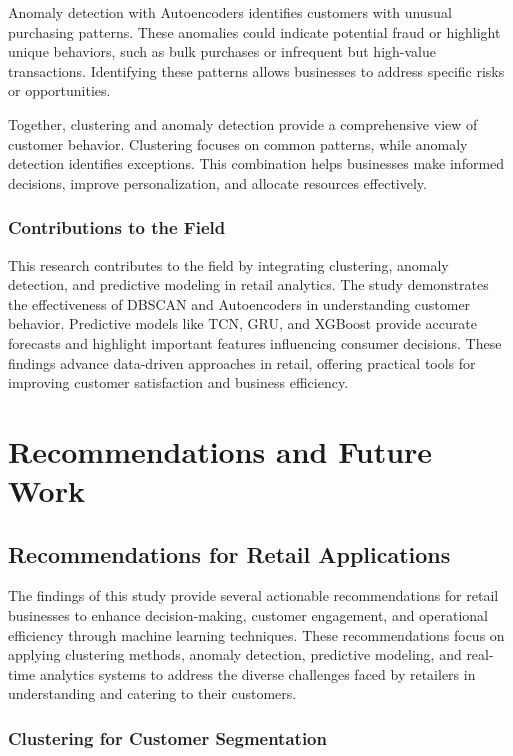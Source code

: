 \documentclass[12pt, a4paper,twoside]{report}
\theoremstyle{plain} %
\theoremstyle{definition} %
\theoremstyle{remark} %
\numberwithin{equation}{chapter}
\begin{document}
Anomaly detection with Autoencoders identifies customers with unusual purchasing patterns. These anomalies could indicate potential fraud or highlight unique behaviors, such as bulk purchases or infrequent but high-value transactions. Identifying these patterns allows businesses to address specific risks or opportunities.

Together, clustering and anomaly detection provide a comprehensive view of customer behavior. Clustering focuses on common patterns, while anomaly detection identifies exceptions. This combination helps businesses make informed decisions, improve personalization, and allocate resources effectively.

\subsection{Contributions to the Field}

This research contributes to the field by integrating clustering, anomaly detection, and predictive modeling in retail analytics. The study demonstrates the effectiveness of DBSCAN and Autoencoders in understanding customer behavior. Predictive models like TCN, GRU, and XGBoost provide accurate forecasts and highlight important features influencing consumer decisions. These findings advance data-driven approaches in retail, offering practical tools for improving customer satisfaction and business efficiency.




\chapter{Recommendations and Future Work}
\section{Recommendations for Retail Applications}

The findings of this study provide several actionable recommendations for retail businesses to enhance decision-making, customer engagement, and operational efficiency through machine learning techniques. These recommendations focus on applying clustering methods, anomaly detection, predictive modeling, and real-time analytics systems to address the diverse challenges faced by retailers in understanding and catering to their customers.

\subsection{Clustering for Customer Segmentation}
\end{document}
